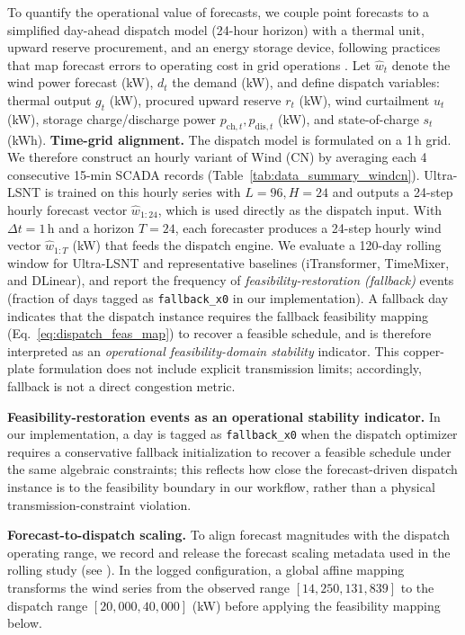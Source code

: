 \documentclass[review,3p,times]{elsarticle}
\begin{document}
To quantify the operational value of forecasts, we couple point forecasts to a simplified day-ahead dispatch model (24-hour horizon) with a thermal unit, upward reserve procurement, and an energy storage device, following practices that map forecast errors to operating cost in grid operations \cite{botterud2011operational,yan2025economicvalue}. Let $\hat{w}_t$ denote the wind power forecast (kW), $d_t$ the demand (kW), and define dispatch variables: thermal output $g_t$ (kW), procured upward reserve $r_t$ (kW), wind curtailment $u_t$ (kW), storage charge/discharge power $p_{\text{ch},t},p_{\text{dis},t}$ (kW), and state-of-charge $s_t$ (kWh). \textbf{Time-grid alignment.} The dispatch model is formulated on a 1\,h grid. We therefore construct an hourly variant of Wind (CN) by averaging each 4 consecutive 15-min SCADA records (Table~\ref{tab:data_summary_windcn}). Ultra-LSNT is trained on this hourly series with $L=96,H=24$ and outputs a 24-step hourly forecast vector $\hat{w}_{1:24}$, which is used directly as the dispatch input. With $\Delta t=1$\,h and a horizon $T=24$, each forecaster produces a 24-step hourly wind vector $\hat{w}_{1:T}$ (kW) that feeds the dispatch engine. We evaluate a 120-day rolling window for Ultra-LSNT and representative baselines (iTransformer, TimeMixer, and DLinear), and report the frequency of \emph{feasibility-restoration (fallback)} events (fraction of days tagged as \texttt{fallback\_x0} in our implementation). A fallback day indicates that the dispatch instance requires the fallback feasibility mapping (Eq.~\ref{eq:dispatch_feas_map}) to recover a feasible schedule, and is therefore interpreted as an \emph{operational feasibility-domain stability} indicator. This copper-plate formulation does not include explicit transmission limits; accordingly, fallback is not a direct congestion metric.

\noindent\textbf{Feasibility-restoration events as an operational stability indicator.}
In our implementation, a day is tagged as \texttt{fallback\_x0} when the dispatch optimizer requires a conservative fallback initialization to recover a feasible schedule under the same algebraic constraints; this reflects how close the forecast-driven dispatch instance is to the feasibility boundary in our workflow, rather than a physical transmission-constraint violation.

\noindent\textbf{Forecast-to-dispatch scaling.}
To align forecast magnitudes with the dispatch operating range, we record and release the forecast scaling metadata used in the rolling study (see ).
In the logged configuration, a global affine mapping transforms the wind series from the observed range $[14{,}250,131{,}839]$ to the dispatch range $[20{,}000,40{,}000]$ (kW) before applying the feasibility mapping below.
\end{document}
